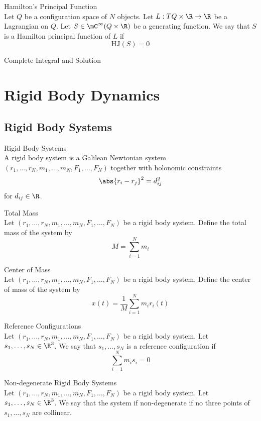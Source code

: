 \documentclass[a4paper]{article}
\begin{document}
\begin{defn}{Hamilton's Principal Function}{}\\
Let $Q$ be a configuration space of $N$ objects. Let $L:TQ\times\R\to\R$ be a Lagrangian on $Q$. Let $S\in\mC^\infty(Q\times\R)$ be a generating function. We say that $S$ is a Hamilton principal function of $L$ if $$\text{HJ}(S)=0$$
\end{defn}

\begin{thm}{Complete Integral and Solution}{}
\end{thm}

\pagebreak
\section{Rigid Body Dynamics}
\subsection{Rigid Body Systems}
\begin{defn}{Rigid Body Systems}{}\\
A rigid body system is a Galilean Newtonian system $(r_1,\dots,r_N,m_1,\dots,m_N,F_1,\dots,F_N)$ together with holonomic constraints $$\abs{r_i-r_j}^2=d_{ij}^2$$ for $d_{ij}\in\R$. 
\end{defn}

\begin{defn}{Total Mass}{}\\
Let $(r_1,\dots,r_N,m_1,\dots,m_N,F_1,\dots,F_N)$ be a rigid body system. Define the total mass of the system by $$M=\sum_{i=1}^Nm_i$$
\end{defn}

\begin{defn}{Center of Mass}{}\\
Let $(r_1,\dots,r_N,m_1,\dots,m_N,F_1,\dots,F_N)$ be a rigid body system. Define the center of mass of the system by $$x(t)=\frac{1}{M}\sum_{i=1}^Nm_ir_i(t)$$
\end{defn}

\begin{defn}{Reference Configurations}{}\\
Let $(r_1,\dots,r_N,m_1,\dots,m_N,F_1,\dots,F_N)$ be a rigid body system. Let $s_1,\dots,s_N\in\R^3$. We say that $s_1,\dots,s_N$ is a reference configuration if $$\sum_{i=1}^Nm_is_i=0$$
\end{defn}

\begin{defn}{Non-degenerate Rigid Body Systems}{}\\
Let $(r_1,\dots,r_N,m_1,\dots,m_N,F_1,\dots,F_N)$ be a rigid body system. Let $s_1,\dots,s_N\in\R^3$. We say that the system if non-degenerate if no three points of $s_1,\dots,s_N$ are collinear. 
\end{defn}
\end{document}
